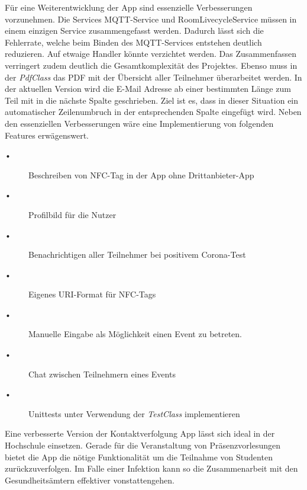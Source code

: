 Für eine Weiterentwicklung der App sind essenzielle Verbesserungen vorzunehmen. Die Services MQTT-Service und RoomLivecycleService müssen in einem einzigen Service zusammengefasst werden. 
Dadurch lässt sich die Fehlerrate, welche beim Binden des MQTT-Services entstehen deutlich reduzieren. Auf etwaige Handler könnte verzichtet werden. 
Das Zusammenfassen verringert zudem deutlich die Gesamtkomplexität des Projektes.
 Ebenso muss in der \textit{PdfClass} das PDF mit der Übersicht aller Teilnehmer überarbeitet werden. 
 In der aktuellen Version wird die E-Mail Adresse ab einer bestimmten Länge zum Teil mit in die nächste Spalte geschrieben.
 Ziel ist es, dass in dieser Situation ein automatischer Zeilenumbruch in der entsprechenden Spalte eingefügt wird.
Neben den essenziellen Verbesserungen  wäre eine Implementierung von folgenden Features erwägenswert.
\begin{description}
\item[•]Beschreiben von NFC-Tag in der App ohne Drittanbieter-App 
\item[•]Profilbild für die Nutzer
\item[•]Benachrichtigen aller Teilnehmer bei positivem Corona-Test
\item[•]Eigenes URI-Format für NFC-Tags
\item[•]Manuelle Eingabe als Möglichkeit einen Event zu betreten.
\item[•]Chat zwischen Teilnehmern eines Events
\item[•]Unittests unter Verwendung der \textit{TestClass} implementieren
\end{description}


Eine verbesserte Version der Kontaktverfolgung App lässt sich ideal in der Hochschule einsetzen. 
Gerade für die Veranstaltung von Präsenzvorlesungen bietet die App die nötige Funktionalität um die Teilnahme von Studenten zurückzuverfolgen.
Im Falle einer Infektion kann so die Zusammenarbeit mit den Gesundheitsämtern effektiver vonstattengehen.